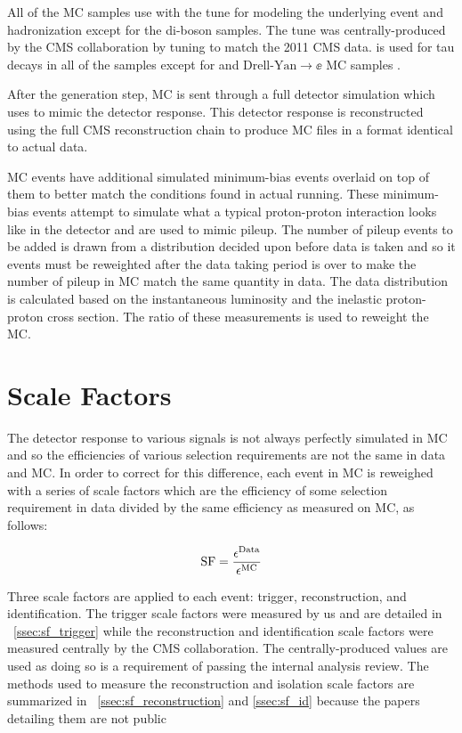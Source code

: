 All of the MC samples use \PYTHIAsix with the \ZTwoStar tune for modeling the
underlying event and hadronization except for the di-boson samples. The
\ZTwoStar tune was centrally-produced by the CMS collaboration by tuning
\PYTHIAsix to match the 2011 CMS data. \Tauola is used for tau decays in all of
the samples except for \ttbar and \POWHEG $\text{Drell-Yan} \to \ee$ MC samples
\cite{was_2007}.



After the generation step, MC is sent through a full detector simulation which
uses \GEANTfour \cite{agostinelli2003} to mimic the detector response. This
detector response is reconstructed using the full CMS reconstruction chain to
produce MC files in a format identical to actual data.

MC events have additional simulated minimum-bias events overlaid on top of them
to better match the conditions found in actual running. These minimum-bias
events attempt to simulate what a typical proton-proton interaction looks like
in the detector and are used to mimic pileup. The number of pileup events to be
added is drawn from a distribution decided upon before data is taken and so it
events must be reweighted after the data taking period is over to make the
number of pileup in MC match the same quantity in data. The data distribution
is calculated based on the instantaneous luminosity and the inelastic
proton-proton cross section. The ratio of these measurements is used to
reweight the MC.

\section{Scale Factors}
\label{sec:scale_factors}

The detector response to various signals is not always perfectly simulated in
MC and so the efficiencies of various selection requirements are not the same
in data and MC. In order to correct for this difference, each event in MC is
reweighed with a series of scale factors which are the efficiency of some
selection requirement in data divided by the same efficiency as measured on MC,
as follows:

\begin{equation}
    \label{eq:sf}
    \text{SF} = \frac{\epsilon^{\text{Data}}}{\epsilon^{\text{MC}}}
\end{equation}

Three scale factors are applied to each event: trigger, reconstruction, and
identification. The trigger scale factors were measured by us and are detailed
in \SEC~\ref{ssec:sf_trigger} while the reconstruction and identification scale
factors were measured centrally by the CMS collaboration. The
centrally-produced values are used as doing so is a requirement of passing the
internal analysis review. The methods used to measure the reconstruction and
isolation scale factors are summarized in \SECS~\ref{ssec:sf_reconstruction}
and \ref{ssec:sf_id} because the papers detailing them are not public

